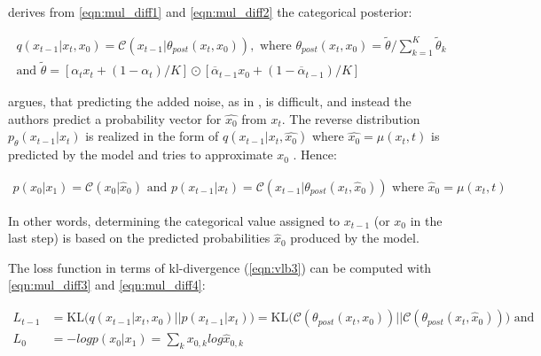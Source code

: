 \cite{hoogeboom2021ArgmaxFlowsMultinomial} derives from \autoref{eqn:mul_diff1} and \autoref{eqn:mul_diff2} the categorical posterior:

\begin{equation}
  \begin{gathered}
  \label{eqn:mul_diff3}
  q(x_{t-1}|x_t, x_{0}) = \mathcal{C}(x_{t-1}|\theta_{post}(x_t,x_0)),\textrm{ where } \theta_{post}(x_t,x_0)=\tilde{\theta}/\sum_{k=1}^{K}\tilde{\theta}_k \\
  \textrm{and } \tilde{\theta} = \left[\alpha_tx_{t}+(1-\alpha_t)/K \right] \odot \left[\overline{\alpha}_{t-1}x_{0}+(1-\overline{\alpha}_{t-1})/K \right]
  \end{gathered}
\end{equation}

\cite{hoogeboom2021ArgmaxFlowsMultinomial} argues, that predicting the added noise, as in \cite{ho2020DenoisingDiffusionProbabilistic},
is difficult, and instead the authors predict a probability vector for $\hat{x_0}$ from $x_t$.
The reverse distribution $p_\theta(x_{t-1}|x_t)$ is realized in the form of $q(x_{t-1}|x_t,\hat{x_0})$ where $\hat{x_0}=\mu(x_t, t)$ is predicted by the model and tries to approximate $x_0$ \cite{hoogeboom2021ArgmaxFlowsMultinomial}.
Hence:

\begin{equation}
  \begin{align*}
    \label{eqn:mul_diff4}
    p(x_0|x_1) = \mathcal{C}(x_0|\hat{x}_0) \textrm{ and } p(x_{t-1}|x_t) =  \mathcal{C}(x_{t-1}|\theta_{post}(x_t, \hat{x}_0)) \textrm{ where } \hat{x}_0=\mu(x_t,t)
  \end{align*}
\end{equation}

In other words, determining the categorical value assigned to $x_{t-1}$ (or $x_0$ in the last step) is based on the predicted probabilities $\hat{x}_0$ produced by the model.


The loss function in terms of \gls{kl}-divergence (\autoref{eqn:vlb3}) can be computed with \autoref{eqn:mul_diff3} and \autoref{eqn:mul_diff4}:

\begin{equation}
  \begin{align*}
    \label{eqn:mul_diff5}
    L_{t-1}&=\text{KL}\Big(q(x_{t-1}|x_t, x_0)\big\vert\big\vert p(x_{t-1}|x_t)\Big) = \text{KL}\Big(\mathcal{C}(\theta_{post}(x_t, x_0))\big\vert\big\vert \mathcal{C}(\theta_{post}(x_t, \hat{x}_0))\Big) \textrm{ and}\\
    L_{0} &= -logp(x_0|x_1) = \sum_{k}^{}x_{0,k}log\hat{x}_{0,k}
  \end{align*}
\end{equation}

